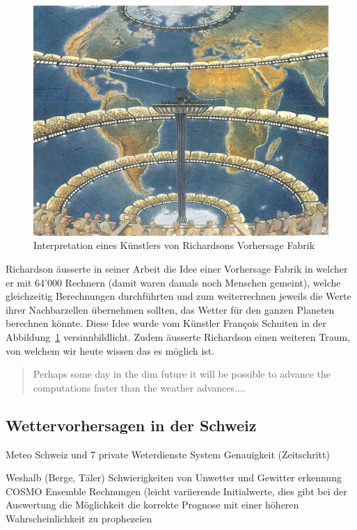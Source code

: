 \begin{refsection}
\begin{figure}
\centering
\includegraphics{klima/64000.jpg}
\caption{Interpretation eines Künstlers von Richardsons Vorhersage Fabrik \cite{klima:biography}
\label{klima:geschichte:richardson}}
\end{figure}

Richardson äusserte in seiner Arbeit die Idee einer Vorhersage Fabrik in welcher er mit 64'000 Rechnern (damit waren damals noch Menschen gemeint), welche gleichzeitig Berechnungen durchführten und zum weiterrechnen jeweils die Werte ihrer Nachbarzellen übernehmen sollten, das Wetter für den ganzen Planeten berechnen könnte. Diese Idee wurde vom Künstler François Schuiten in der Abbildung~\ref{klima:geschichte:richardson} versinnbildlicht.
Zudem äusserte Richardson einen weiteren Traum, von welchem wir heute wissen das es möglich ist.
\begin{quote}
Perhaps some day in the dim future it will be possible to advance the computations faster than the weather advances....
\end{quote}

\subsection{Wettervorhersagen in der Schweiz
\label{section:klima:wettervorhersagen}}
Meteo Schweiz und 7 private Weterdienste
System
Genauigkeit (Zeitschritt)

Weshalb (Berge, Täler)
Schwierigkeiten von Unwetter und Gewitter erkennung
COSMO
Ensemble Rechnungen (leicht variierende Initialwerte, dies gibt bei der Auswertung die Möglichkeit die korrekte Prognose mit einer höheren Wahrscheinlichkeit zu prophezeien



\end{refsection}
